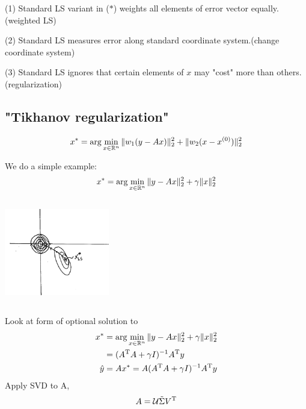 	(1) Standard LS variant in ($*$) weights all elements of error vector equally.(weighted LS)
	
	(2) Standard LS measures error along standard coordinate system.(change coordinate system)
	
	(3) Standard LS ignores that certain elements of $x$ may "cost" more than others.(regularization)

\subsection{"Tikhanov regularization"}
$$x^* =\arg\min_{x\in \mathbb{R}^n}\Vert w_1(y-Ax)\Vert_2^2 + \Vert w_2(x - x^{(0)})\Vert_2^2$$

We do a simple example:
\begin{equation*}
x^* = \arg\min_{x\in \mathbb{R}^n}\Vert y-Ax\Vert_2^2 + \gamma\Vert x\Vert_2^2
\end{equation*}

\begin{marginfigure}
	\centering
	\includegraphics[width=1.8in,height=1.8in]{figures/ch06/figure4.png}
\end{marginfigure}

Look at form of optional solution to 
\begin{align*}
x^* &= \arg\min_{x\in \mathbb{R}^n}\Vert y-Ax\Vert_2^2 + \gamma\Vert x\Vert^2_2\\
&= (A^{{\rm T}}A + \gamma I)^{-1}A^{{\rm T}}y\\
\hat{y}&= Ax^* = A(A^{{\rm T}}A + \gamma I)^{-1}A^{{\rm T}}y\\
\end{align*}
Apply SVD to A,
$$A = \mathcal{U}\tilde{\Sigma}V^{{\rm T}}$$

